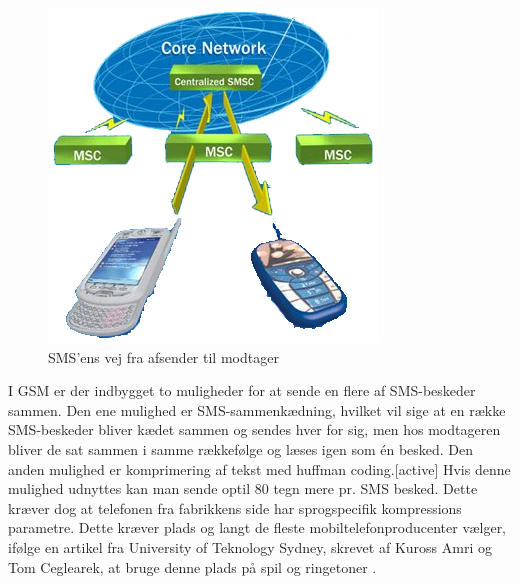 \begin{figure}[H]
\centering
\includegraphics []{Billeder/GSMnetvaerk.png}
\caption {SMS'ens vej fra afsender til modtager \cite{info}}
\label {GSM}
\end{figure} 

I GSM er der indbygget to muligheder for at sende en flere af SMS-beskeder sammen. Den ene mulighed er SMS-sammenkædning, hvilket vil sige at en række SMS-beskeder bliver kædet sammen og sendes hver for sig, men hos modtageren bliver de sat sammen i samme rækkefølge og læses igen som én besked. Den anden mulighed er komprimering af tekst med huffman coding.[active] Hvis denne mulighed udnyttes kan man sende optil 80 tegn mere pr. SMS besked. Dette kræver dog at telefonen fra fabrikkens side har sprogspecifik kompressions parametre. Dette kræver plads og langt de fleste mobiltelefonproducenter vælger, ifølge en artikel fra University of Teknology Sydney, skrevet af Kuross Amri og Tom Ceglearek, at bruge denne plads på spil og ringetoner \cite{UNI}. 
